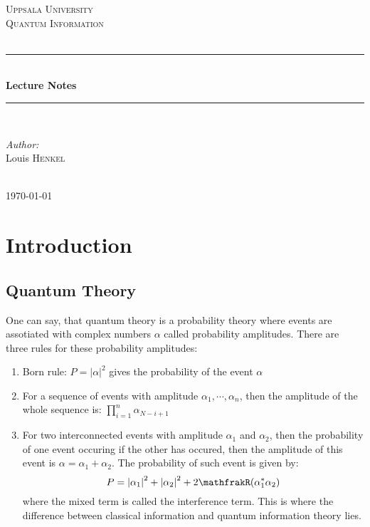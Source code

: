 \documentclass[12pt]{book}
\theoremstyle{definition}
\newcommand{\abs}[1]{\left\vert {#1}\right\vert}
\let\Re\mathfrakR
\DeclareMathOperator{\Re}{Re}
\begin{document}
\begin{titlepage}

\newcommand{\HRule}{\rule{\linewidth}{0.5mm}}
\center

\textsc{\LARGE Uppsala University}\\[1.5cm]
\textsc{\Large Quantum Information}\\[0.5cm]
\textsc{\large }\\[0.5cm]


\HRule \\[0.4cm]
{\huge \bfseries Lecture Notes}\\[0.4cm]
\HRule \\[1.5cm]

\begin{minipage}{0.4\textwidth}
\begin{flushleft} \large
\emph{Author:}\\
Louis \textsc{Henkel}\\
\end{flushleft}

\end{minipage}\\[2cm]


{\large \today}\\[2cm]
\vfill

\end{titlepage}
\tableofcontents


\chapter{Introduction}
\section{Quantum Theory}

One can say, that quantum theory is a probability theory where events are assotiated with complex numbers $\alpha$ called probability amplitudes. There are three rules for these probability amplitudes:
\begin{enumerate}[label = (\alph*)]
  \item Born rule: $P = \abs{\alpha}^2$ gives the probability of the event $\alpha$
  \item For a sequence of events with amplitude $\alpha_1, \cdots, \alpha_n$, then the amplitude of the whole sequence is: $\prod\limits_{i=1}^{n} \alpha_{N-i+1}$
  \item For two interconnected events with amplitude $\alpha_1$ and $\alpha_2$, then the probability of one event occuring if the other has occured, then the amplitude of this event is $\alpha = \alpha_1 + \alpha_2$. The probability of such event is given by:
  \begin{equation}
    P = \abs{\alpha_1}^2 + \abs{\alpha_2}^2 + 2 \Re(\alpha_1^*\alpha_2)
  \end{equation}
  where the mixed term is called the interference term. This is where the difference between classical information and quantum information theory lies.
\end{enumerate}
\end{document}
